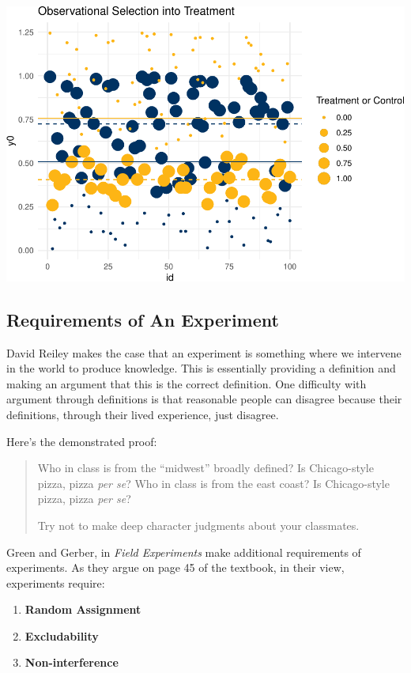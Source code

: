 \documentclass[
]{article}
\providecommand{\tightlist}{%
  \setlength{\itemsep}{0pt}\setlength{\parskip}{0pt}}
\begin{document}
\includegraphics{241-live-session_files/figure-latex/recreate plot -- for selection case-1.pdf}

\hypertarget{requirements-of-an-experiment}{%
\subsection{Requirements of An Experiment}\label{requirements-of-an-experiment}}

David Reiley makes the case that an experiment is something where we intervene in the world to produce knowledge. This is essentially providing a definition and making an argument that this is the correct definition. One difficulty with argument through definitions is that reasonable people can disagree because their definitions, through their lived experience, just disagree.

Here's the demonstrated proof:

\begin{quote}
Who in class is from the ``midwest'' broadly defined? Is Chicago-style pizza, pizza \emph{per se}?
Who in class is from the east coast? Is Chicago-style pizza, pizza \emph{per se}?

Try not to make deep character judgments about your classmates.
\end{quote}

Green and Gerber, in \emph{Field Experiments} make additional requirements of experiments. As they argue on page 45 of the textbook, in their view, experiments require:

\begin{enumerate}
\def\labelenumi{\arabic{enumi}.}
\tightlist
\item
  \textbf{Random Assignment}
\item
  \textbf{Excludability}
\item
  \textbf{Non-interference}
\end{enumerate}
\end{document}
